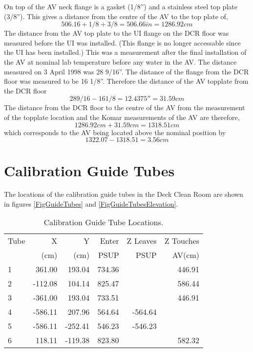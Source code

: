 On top of the AV neck flange is a gasket (1/8'') and a stainless steel
top plate (3/8'').  This gives a distance from the centre of the
AV to the top plate of,
\[
     506.16 + 1/8 + 3/8 = 506.66 in = 1286.92 cm
\]
The distance from the AV top plate to the UI flange on the DCR floor
was measured before the UI was installed.  (This flange is no longer
accessable since the UI has been installed.)  This was a measurement
after the final installation of the AV at nominal lab temperature before
any water in the AV.
The distance measured on 3 April 1998 was
28 9/16''.  The distance of the flange from the DCR floor was measured
to be 16 1/8''.  Therefore the distance of the AV topplate from the
DCR floor
\[
           28 9/16 - 16 1/8 = 12.4375'' = 31.59 cm
\]
The distance from the DCR floor to the centre of the AV from the 
measurement of the topplate location and the Komar measurements of the
AV are therefore,
\[
          1286.92 cm + 31.59 cm  = 1318.51 cm
\]
which corresponds to the AV being located above the nominal position
by 
\[
           1322.07 - 1318.51 = 3.56 cm
\]







\section {Calibration Guide Tubes}
  The locations of the calibration guide tubes in the Deck Clean Room
are shown in figures \ref{FigGuideTubes} and \ref{FigGuideTubesElevation}.


\begin{table}
\begin{center}
\begin{tabular}{|l|r|r|r|r|r|}
\hline
Tube &   X       &   Y     & Enter & Z Leaves & Z Touches\\
     &    (cm)   &   (cm)  & PSUP  & PSUP     & AV(cm)   \\
\hline
 1   &  361.00   &  193.04 & 734.36 &         & 446.91 \\
\hline
 2   & -112.08   &  104.14 & 825.47 &         & 586.44 \\
\hline
 3   & -361.00   &  193.04 & 733.51 &         & 446.91 \\
\hline
 4   & -586.11   &  207.96 & 564.64 & -564.64  & \\
\hline
 5   & -586.11   & -252.41 & 546.23 & -546.23  & \\
\hline
 6   &  118.11   & -119.38 & 823.80 &          & 582.32 \\
\hline
\end{tabular}
\caption[Calibration Guide Tube Locations]{
  Calibration Guide Tube Locations.
  }
\end{center}
\end{table}

